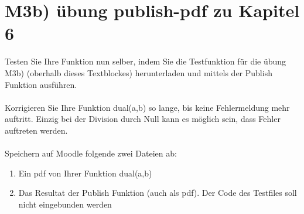\section{M3b) übung publish-pdf zu Kapitel 6}
Testen Sie Ihre Funktion nun selber, indem Sie die Testfunktion für die übung M3b) (oberhalb dieses Textblockes) herunterladen und mittels der Publish Funktion ausführen.
\\\\
Korrigieren Sie Ihre Funktion dual(a,b) so lange, bis keine Fehlermeldung mehr auftritt.
Einzig bei der Division durch Null kann es möglich sein, dass Fehler auftreten werden.
\\\\
Speichern auf Moodle folgende zwei Dateien ab:
\begin{enumerate}[$a)$]
\item Ein pdf von Ihrer Funktion dual(a,b)
\item Das Resultat der Publish Funktion (auch als pdf).
Der Code des Testfiles soll nicht eingebunden werden
\end{enumerate}


